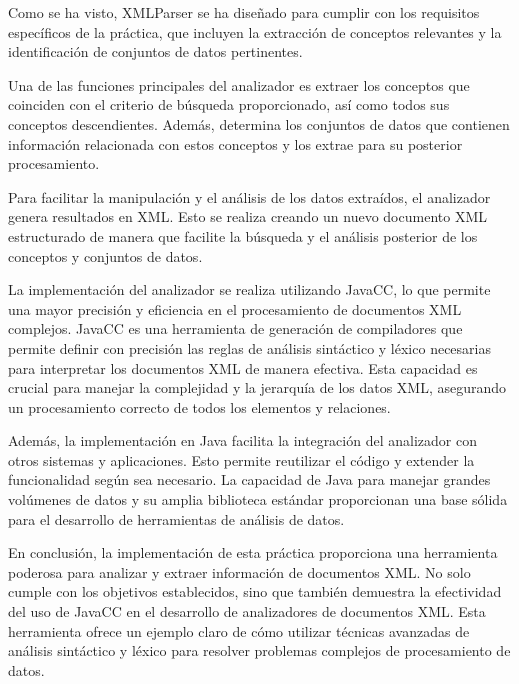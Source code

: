 Como se ha visto, XMLParser se ha diseñado para cumplir con los requisitos específicos de la práctica, que incluyen la extracción de conceptos relevantes y la identificación de conjuntos de datos pertinentes.

Una de las funciones principales del analizador es extraer los conceptos que coinciden con el criterio de búsqueda proporcionado, así como todos sus conceptos descendientes. Además, determina los conjuntos de datos que contienen información relacionada con estos conceptos y los extrae para su posterior procesamiento.

Para facilitar la manipulación y el análisis de los datos extraídos, el analizador genera resultados en XML. Esto se realiza creando un nuevo documento XML estructurado de manera que facilite la búsqueda y el análisis posterior de los conceptos y conjuntos de datos.

La implementación del analizador se realiza utilizando JavaCC, lo que permite una mayor precisión y eficiencia en el procesamiento de documentos XML complejos. JavaCC es una herramienta de generación de compiladores que permite definir con precisión las reglas de análisis sintáctico y léxico necesarias para interpretar los documentos XML de manera efectiva. Esta capacidad es crucial para manejar la complejidad y la jerarquía de los datos XML, asegurando un procesamiento correcto de todos los elementos y relaciones.

Además, la implementación en Java facilita la integración del analizador con otros sistemas y aplicaciones. Esto permite reutilizar el código y extender la funcionalidad según sea necesario. La capacidad de Java para manejar grandes volúmenes de datos y su amplia biblioteca estándar proporcionan una base sólida para el desarrollo de herramientas de análisis de datos.

En conclusión, la implementación de esta práctica proporciona una herramienta poderosa para analizar y extraer información de documentos XML. No solo cumple con los objetivos establecidos, sino que también demuestra la efectividad del uso de JavaCC en el desarrollo de analizadores de documentos XML. Esta herramienta ofrece un ejemplo claro de cómo utilizar técnicas avanzadas de análisis sintáctico y léxico para resolver problemas complejos de procesamiento de datos.



